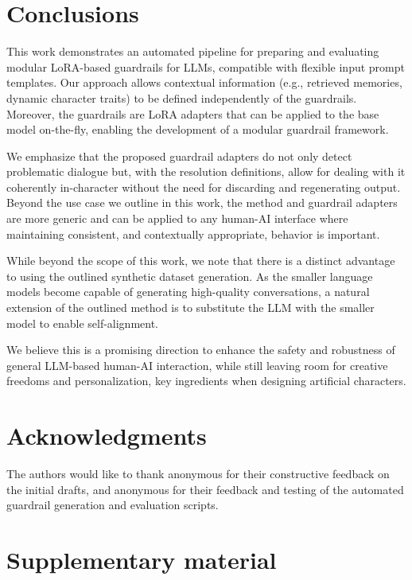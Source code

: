 \documentclass[letterpaper]{article}
\begin{document}
\section{Conclusions}
This work demonstrates an automated pipeline for preparing and evaluating modular LoRA-based guardrails for LLMs, compatible with flexible input prompt templates. Our approach allows contextual information (e.g., retrieved memories, dynamic character traits) to be defined independently of the guardrails.
Moreover, the guardrails are LoRA adapters that can be applied to the base model on-the-fly, enabling the development of a modular guardrail framework.

We emphasize that the proposed guardrail adapters do not only detect problematic dialogue but, with the resolution definitions, allow for dealing with it coherently in-character without the need for discarding and regenerating output.
Beyond the use case we outline in this work, the method and guardrail adapters are more generic and can be applied to any human-AI interface where maintaining consistent, and contextually appropriate, behavior is important.  

While beyond the scope of this work, we note that there is a distinct advantage to using the outlined synthetic dataset generation. As the smaller language models become capable of generating high-quality conversations, a natural extension of the outlined method is to substitute the LLM with the smaller model to enable self-alignment.

We believe this is a promising direction to enhance the safety and robustness of general LLM-based human-AI interaction, while still leaving room for creative freedoms and personalization, key ingredients when designing artificial characters.


\section{Acknowledgments}
The authors would like to thank anonymous for their constructive feedback on the initial drafts, and anonymous for their feedback and  testing of the automated guardrail generation and evaluation scripts. 

\footnotesize


    
\onecolumn
\appendix 
\section{Supplementary material}\label{app:appendix}
\end{document}
